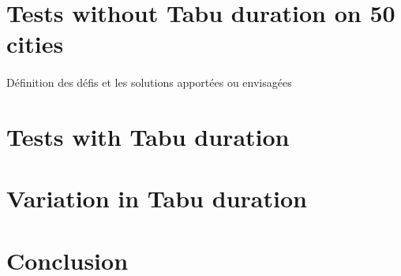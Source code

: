 \documentclass[12pt,oneside,a4paper]{article}
\begin{document}
\section{Tests without Tabu duration on 50 cities}
\paragraph{}
Définition des défis et les solutions apportées ou envisagées

\section{Tests with Tabu duration}

\section{Variation in Tabu duration}

\section{Conclusion}
\paragraph{}
\end{document}
